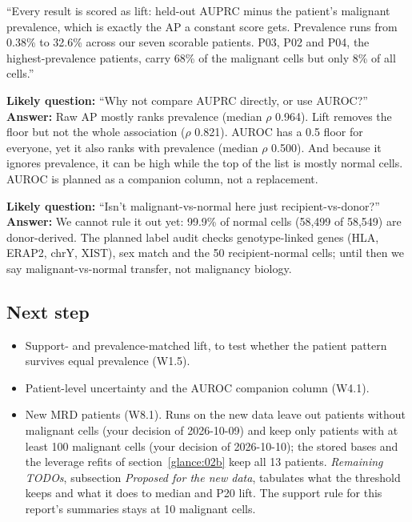 \begin{teambox}
``Every result is scored as lift: held-out AUPRC minus the patient's malignant prevalence, which is exactly the AP a constant score gets. Prevalence runs from 0.38\% to 32.6\% across our seven scorable patients. P03, P02 and P04, the highest-prevalence patients, carry 68\% of the malignant cells but only 8\% of all cells.''

\textbf{Likely question:} ``Why not compare AUPRC directly, or use AUROC?''\\
\textbf{Answer:} Raw AP mostly ranks prevalence (median $\rho$ 0.964). Lift removes the floor but not the whole association ($\rho$ 0.821). AUROC has a 0.5 floor for everyone, yet it also ranks with prevalence (median $\rho$ 0.500). And because it ignores prevalence, it can be high while the top of the list is mostly normal cells. AUROC is planned as a companion column, not a replacement.

\textbf{Likely question:} ``Isn't malignant-vs-normal here just recipient-vs-donor?''\\
\textbf{Answer:} We cannot rule it out yet: 99.9\% of normal cells (58,499 of 58,549) are donor-derived. The planned label audit checks genotype-linked genes (HLA, ERAP2, chrY, XIST), sex match and the 50 recipient-normal cells; until then we say malignant-vs-normal transfer, not malignancy biology.
\end{teambox}

\subsection*{Next step}
\begin{itemize}
  \item Support- and prevalence-matched lift, to test whether the patient pattern survives equal prevalence (W1.5).
  \item Patient-level uncertainty and the AUROC companion column (W4.1).
  \item New MRD patients (W8.1). Runs on the new data leave out patients without malignant cells (your decision of 2026-10-09) and keep only patients with at least 100 malignant cells (your decision of 2026-10-10); the stored bases and the leverage refits of section~\ref{glance:02b} keep all 13 patients. \emph{Remaining TODOs}, subsection \emph{Proposed for the new data}, tabulates what the threshold keeps and what it does to median and P20 lift. The support rule for this report's summaries stays at 10 malignant cells.
\end{itemize}

